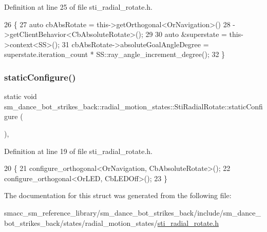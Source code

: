 Definition at line 25 of file sti\+\_\+radial\+\_\+rotate.\+h.


\begin{DoxyCode}
26   \{
27     \textcolor{keyword}{auto} cbAbsRotate = this->getOrthogonal<OrNavigation>()
28                            ->getClientBehavior<CbAbsoluteRotate>();
29 
30     \textcolor{keyword}{auto} &superstate = this->context<SS>();
31     cbAbsRotate->absoluteGoalAngleDegree = superstate.iteration\_count * SS::ray\_angle\_increment\_degree();
32   \}
\end{DoxyCode}
\mbox{\label{structsm__dance__bot__strikes__back_1_1radial__motion__states_1_1StiRadialRotate_af99632e42387e469ee09db280aee4dc2}} 
\subsubsection{\texorpdfstring{static\+Configure()}{staticConfigure()}}
{\footnotesize\ttfamily static void sm\+\_\+dance\+\_\+bot\+\_\+strikes\+\_\+back\+::radial\+\_\+motion\+\_\+states\+::\+Sti\+Radial\+Rotate\+::static\+Configure (\begin{DoxyParamCaption}{ }\end{DoxyParamCaption})\hspace{0.3cm}{\ttfamily [inline]}, {\ttfamily [static]}}



Definition at line 19 of file sti\+\_\+radial\+\_\+rotate.\+h.


\begin{DoxyCode}
20   \{
21     configure\_orthogonal<OrNavigation, CbAbsoluteRotate>();
22     configure\_orthogonal<OrLED, CbLEDOff>();
23   \}
\end{DoxyCode}


The documentation for this struct was generated from the following file\+:\begin{DoxyCompactItemize}
\item 
smacc\+\_\+sm\+\_\+reference\+\_\+library/sm\+\_\+dance\+\_\+bot\+\_\+strikes\+\_\+back/include/sm\+\_\+dance\+\_\+bot\+\_\+strikes\+\_\+back/states/radial\+\_\+motion\+\_\+states/\hyperlink{sm__dance__bot__strikes__back_2include_2sm__dance__bot__strikes__back_2states_2radial__motion__states_2sti__radial__rotate_8h}{sti\+\_\+radial\+\_\+rotate.\+h}\end{DoxyCompactItemize}
